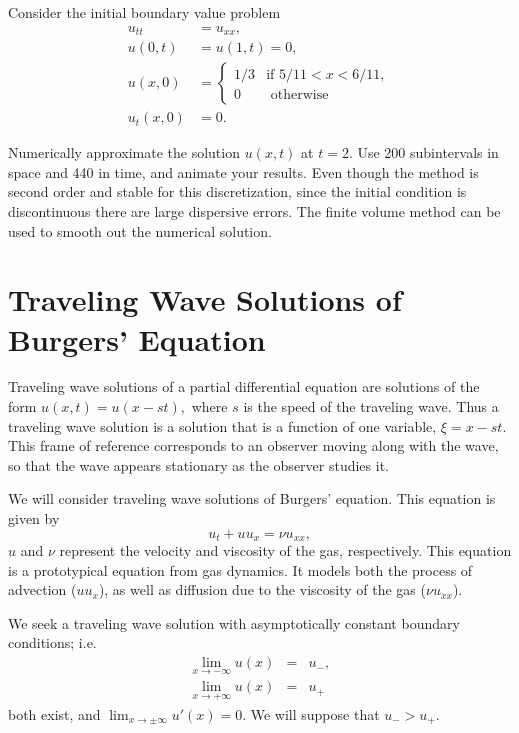 \begin{problem}
	Consider the initial boundary value problem 
	\begin{align*}
		u_{tt} &= u_{xx}, \\
		u(0,t) &= u(1,t) = 0, \\
		u(x,0) &= \begin{cases} 1/3 & \text{if } 5/11 < x < 6/11,\\
		0 & \text{ otherwise}
		\end{cases}\\ 
		u_t(x,0) &= 0.
	\end{align*}
	
	Numerically approximate the solution $u(x,t)$ at $t = 2$.  Use 200 subintervals in space and 440 in time, and animate your results.  Even though the method is second order and stable for this discretization, since the initial condition is discontinuous there are large dispersive errors.  The finite volume method can be used to smooth out the numerical solution. 
\end{problem}




\section{Traveling Wave Solutions of Burgers' Equation}
Traveling wave solutions of a partial differential equation are solutions of the form $u(x,t) = u(x-st),$ where $s$ is the speed of the traveling wave. Thus a traveling wave solution is a solution that is a function of one variable, $\xi= x-st$. This frame of reference corresponds to an observer 
moving along with the wave, so that the wave appears stationary as the observer studies it.

We will consider traveling wave solutions of Burgers' equation. This equation is given by
\[u_t + u u_x = \nu u_{xx},\]
$u$ and $\nu$ represent the velocity and viscosity of the gas, respectively. This equation is a prototypical equation from gas dynamics. It models both the process of advection ($u u_x$), as well as diffusion due to the viscosity of the 
gas ($\nu u_{xx}$).


We seek a traveling wave solution with asymptotically constant boundary conditions; i.e. 
\begin{eqnarray*}
\lim_{x \to -\infty}u(x) &=& u_-,\\
\lim_{x \to +\infty}u(x) &=& u_+
\end{eqnarray*}
both exist, and  $\lim_{x \to \pm \infty}u'(x) = 0$. We will suppose that $u_- > u_+.$

